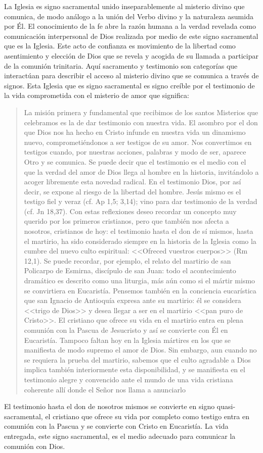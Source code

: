 La Iglesia es signo sacramental unido inseparablemente al misterio divino que comunica, de modo análogo a la unión del Verbo divino y la naturaleza asumida por Él. El conocimiento de la fe abre la razón humana a la verdad revelada como comunicación interpersonal de Dios realizada por medio de este signo sacramental que es la Iglesia. Este acto de confianza es movimiento de la libertad como asentimiento y elección de Dios que se revela y acogida de su llamada a participar de la comunión trinitaria. Aquí sacramento y testimonio son categorías que interactúan para describir el acceso al misterio divino que se comunica a través de signos. Esta Iglesia que es signo sacramental es signo creíble por el testimonio de la vida comprometida con el misterio de amor que significa: \blockquote[][\,(SCa 85)]{La misión primera y fundamental que recibimos de los santos Misterios que celebramos es la de dar testimonio con nuestra vida. El asombro por el don que Dios nos ha hecho en Cristo infunde en nuestra vida un dinamismo nuevo, comprometiéndonos a ser testigos de su amor. Nos convertimos en testigos cuando, por nuestras acciones, palabras y modo de ser, aparece Otro y se comunica. Se puede decir que el testimonio es el medio con el que la verdad del amor de Dios llega al hombre en la historia, invitándolo a acoger libremente esta novedad radical. En el testimonio Dios, por así decir, se expone al riesgo de la libertad del hombre. Jesús mismo es el testigo fiel y veraz (cf. Ap 1,5; 3,14); vino para dar testimonio de la verdad (cf. Jn 18,37). Con estas reflexiones deseo recordar un concepto muy querido por los primeros cristianos, pero que también nos afecta a nosotros, cristianos de hoy: el testimonio hasta el don de sí mismos, hasta el martirio, ha sido considerado siempre en la historia de la Iglesia como la cumbre del nuevo culto espiritual: <<Ofreced vuestros cuerpos>> (Rm 12,1). Se puede recordar, por ejemplo, el relato del martirio de san Policarpo de Esmirna, discípulo de san Juan: todo el acontecimiento dramático es descrito como una liturgia, más aún como si el mártir mismo se convirtiera en Eucaristía. Pensemos también en la conciencia eucarística que san Ignacio de Antioquía expresa ante su martirio: él se considera <<trigo de Dios>> y desea llegar a ser en el martirio <<pan puro de Cristo>>. El cristiano que ofrece su vida en el martirio entra en plena comunión con la Pascua de Jesucristo y así se convierte con Él en Eucaristía. Tampoco faltan hoy en la Iglesia mártires en los que se manifiesta de modo supremo el amor de Dios. Sin embargo, aun cuando no se requiera la prueba del martirio, sabemos que el culto agradable a Dios implica también interiormente esta disponibilidad, y se manifiesta en el testimonio alegre y convencido ante el mundo de una vida cristiana coherente allí donde el Señor nos llama a anunciarlo}. El testimonio hasta el don de nosotros mismos se convierte en signo quasi-sacramental, el cristiano que ofrece su vida por completo como testigo entra en comunión con la Pascua y se convierte con Cristo en Eucaristía. La vida entregada, este signo sacramental, es el medio adecuado para comunicar la comunión con Dios.
